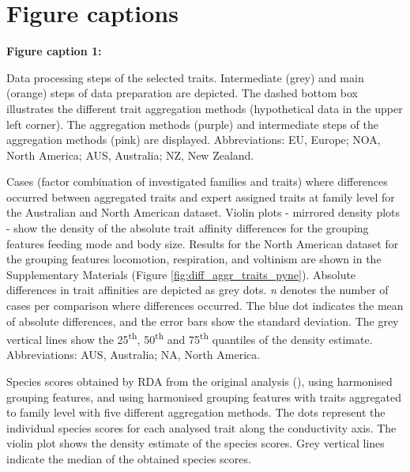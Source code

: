 \documentclass[12pt]{article}
\begin{document}
\section*{Figure captions}

\textbf{Figure caption 1:}

Data processing steps of the selected traits. Intermediate (grey) and main (orange) steps of data preparation are depicted. The dashed bottom box illustrates the different trait aggregation methods (hypothetical data in the upper left corner). The aggregation methods (purple) and intermediate steps of the aggregation methods (pink) are displayed. Abbreviations: EU, Europe; NOA, North America; AUS, Australia; NZ, New Zealand.
\\


Cases (factor combination of investigated families and traits) where differences occurred between aggregated traits and expert assigned traits at family level for the Australian and North American dataset. Violin plots - mirrored density plots - show the density of the absolute trait affinity differences for the grouping features feeding mode and body size. Results for the North American dataset for the grouping features locomotion, respiration, and voltinism are shown in the Supplementary Materials (Figure \ref{fig:diff_aggr_traits_pyne}). Absolute differences in trait affinities are depicted as grey dots. \textit{n} denotes the number of cases per comparison where differences occurred. The blue dot indicates the mean of absolute differences, and the error bars show the standard deviation. The grey vertical lines show the 25\textsuperscript{th}, 50\textsuperscript{th} and 75\textsuperscript{th} quantiles of the density estimate. Abbreviations: AUS, Australia; NA, North America.
\\


Species scores obtained by RDA from the original analysis (\cite{szocs_effects_2014}), using harmonised grouping features, and using harmonised grouping features with traits aggregated to family level with five different aggregation methods. The dots represent the individual species scores for each analysed trait along the conductivity axis. The violin plot shows the density estimate of the species scores. Grey vertical lines indicate the median of the obtained species scores.
\\
\end{document}
